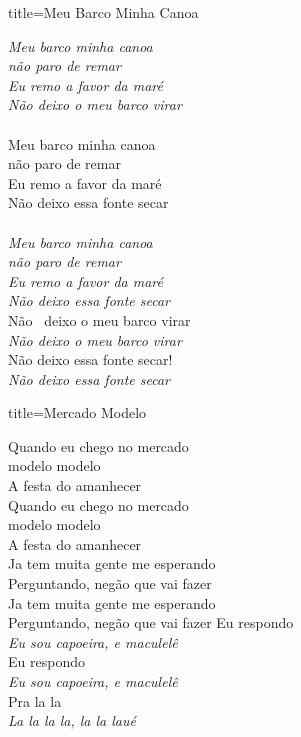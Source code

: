 \documentclass[fontsize=14pt, paper=a4, twoside, DIV=20]{scrreprt} %
\begin{document}
\begin{multicols*}{2}
\begin{song}{title={Meu Barco Minha Canoa}}
\begin{verse*}
            \textit{Meu barco minha canoa }\\
            \textit{não paro de remar}\\
            \textit{Eu remo a favor da maré}\\
            \textit{Não deixo o meu barco virar}\\
            \\
            Meu barco minha canoa\\
            não paro de remar\\
            Eu remo a favor da maré\\
            Não deixo essa fonte secar\\
            \\
            \textit{Meu barco minha canoa }\\
            \textit{não paro de remar}\\
            \textit{Eu remo a favor da maré}\\
            \textit{Não deixo essa fonte secar}\\

            Não \ deixo o meu barco virar\\
            \textit{Não deixo o meu barco virar}\\
            Não deixo essa fonte secar!\\
            \textit{Não deixo essa fonte secar}\\
        \end{verse*}
\end{song}

\begin{song}{title={Mercado Modelo}}
        \begin{verse*}
            Quando eu chego no mercado\\
            modelo modelo\\
            A festa do amanhecer\\
            Quando eu chego no mercado \\
            modelo modelo\\
            A festa do amanhecer\\
            Ja tem muita gente me esperando\\
            Perguntando, negão que vai fazer\\
            Ja tem muita gente me esperando\\
            Perguntando, negão que vai fazer
            Eu respondo\\
            \textit{Eu sou capoeira, e maculelê}\\
            Eu respondo\\
            \textit{Eu sou capoeira, e maculelê}\\
            Pra la la\\
            \textit{La la la la, la la laué }
        \end{verse*}
\end{song}


\end{multicols*}
\end{document}
